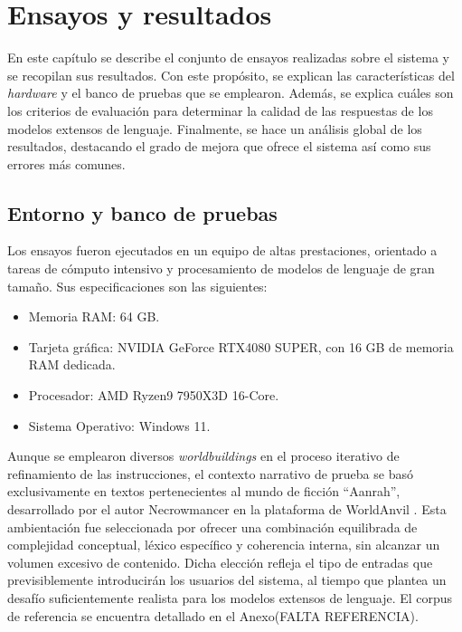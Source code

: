 
\chapter{Ensayos y resultados} %

\label{Chapter4} %
En este capítulo se describe el conjunto de ensayos realizadas sobre el sistema y se recopilan sus resultados.
Con este propósito, se explican las características del \textit{hardware} y el banco de pruebas que se emplearon.
Además, se explica cuáles son los criterios de evaluación para determinar la calidad de las respuestas de los
modelos extensos de lenguaje.
Finalmente, se hace un análisis global de los resultados, destacando el grado de mejora que ofrece el sistema así como
sus errores más comunes.


\section{Entorno y banco de pruebas}
Los ensayos fueron ejecutados en un equipo de altas prestaciones, orientado a tareas de cómputo intensivo y procesamiento de modelos de lenguaje de gran tamaño.
Sus especificaciones son las siguientes:
\begin{itemize}
\item Memoria RAM: 64 GB.
\item Tarjeta gráfica: NVIDIA GeForce RTX4080 SUPER, con 16 GB de memoria RAM dedicada.
\item Procesador: AMD Ryzen9 7950X3D 16-Core.
\item Sistema Operativo: Windows 11.
\end{itemize}

Aunque se emplearon diversos \textit{worldbuildings} en el proceso iterativo de refinamiento de las instrucciones,
el contexto narrativo de prueba se basó exclusivamente en textos pertenecientes al mundo de ficción ``Aanrah'',
desarrollado por el autor Necrowmancer en la plataforma de WorldAnvil \cite{aanrah2024}.
Esta ambientación fue seleccionada por ofrecer una combinación equilibrada de complejidad conceptual,
léxico específico y coherencia interna, sin alcanzar un volumen excesivo de contenido.
Dicha elección refleja el tipo de entradas que previsiblemente introducirán los usuarios del sistema,
al tiempo que plantea un desafío suficientemente realista para los modelos extensos de lenguaje.
El corpus de referencia se encuentra detallado en el Anexo(FALTA REFERENCIA).

